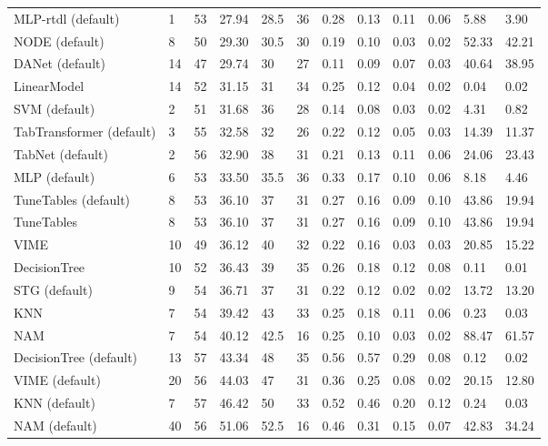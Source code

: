 \begin{tabular}{lllllrllllll}
MLP-rtdl (default) & 1 & 53 & 27.94 & 28.5 & 36 & 0.28 & 0.13 & 0.11 & 0.06 & 5.88 & 3.90 \\
NODE (default) & 8 & 50 & 29.30 & 30.5 & 30 & 0.19 & 0.10 & 0.03 & 0.02 & 52.33 & 42.21 \\
DANet (default) & 14 & 47 & 29.74 & 30 & 27 & 0.11 & 0.09 & 0.07 & 0.03 & 40.64 & 38.95 \\
LinearModel & 14 & 52 & 31.15 & 31 & 34 & 0.25 & 0.12 & 0.04 & 0.02 & 0.04 & 0.02 \\
SVM (default) & 2 & 51 & 31.68 & 36 & 28 & 0.14 & 0.08 & 0.03 & 0.02 & 4.31 & 0.82 \\
TabTransformer (default) & 3 & 55 & 32.58 & 32 & 26 & 0.22 & 0.12 & 0.05 & 0.03 & 14.39 & 11.37 \\
TabNet (default) & 2 & 56 & 32.90 & 38 & 31 & 0.21 & 0.13 & 0.11 & 0.06 & 24.06 & 23.43 \\
MLP (default) & 6 & 53 & 33.50 & 35.5 & 36 & 0.33 & 0.17 & 0.10 & 0.06 & 8.18 & 4.46 \\
TuneTables (default) & 8 & 53 & 36.10 & 37 & 31 & 0.27 & 0.16 & 0.09 & 0.10 & 43.86 & 19.94 \\
TuneTables & 8 & 53 & 36.10 & 37 & 31 & 0.27 & 0.16 & 0.09 & 0.10 & 43.86 & 19.94 \\
VIME & 10 & 49 & 36.12 & 40 & 32 & 0.22 & 0.16 & 0.03 & 0.03 & 20.85 & 15.22 \\
DecisionTree & 10 & 52 & 36.43 & 39 & 35 & 0.26 & 0.18 & 0.12 & 0.08 & 0.11 & 0.01 \\
STG (default) & 9 & 54 & 36.71 & 37 & 31 & 0.22 & 0.12 & 0.02 & 0.02 & 13.72 & 13.20 \\
KNN & 7 & 54 & 39.42 & 43 & 33 & 0.25 & 0.18 & 0.11 & 0.06 & 0.23 & 0.03 \\
NAM & 7 & 54 & 40.12 & 42.5 & 16 & 0.25 & 0.10 & 0.03 & 0.02 & 88.47 & 61.57 \\
DecisionTree (default) & 13 & 57 & 43.34 & 48 & 35 & 0.56 & 0.57 & 0.29 & 0.08 & 0.12 & 0.02 \\
VIME (default) & 20 & 56 & 44.03 & 47 & 31 & 0.36 & 0.25 & 0.08 & 0.02 & 20.15 & 12.80 \\
KNN (default) & 7 & 57 & 46.42 & 50 & 33 & 0.52 & 0.46 & 0.20 & 0.12 & 0.24 & 0.03 \\
NAM (default) & 40 & 56 & 51.06 & 52.5 & 16 & 0.46 & 0.31 & 0.15 & 0.07 & 42.83 & 34.24 \\
\bottomrule
\end{tabular}
